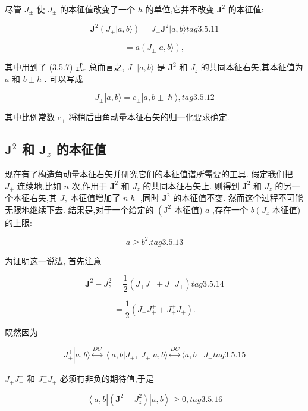 尽管 ${J}_{ \pm }$ 使 ${J}_{ \pm }$ 的本征值改变了一个 $h$ 的单位,它并不改变 ${\mathbf{J}}^{2}$ 的本征值:

$$
{\mathbf{J}}^{2}\left( {{J}_{ \pm }|a, b\rangle }\right) = {J}_{ \pm }{\mathbf{J}}^{2}|a, b\rangle tag{3. 5.11}
$$

$$
= a\left( {{J}_{ \pm }|a, b\rangle }\right) ,
$$

其中用到了 (3.5.7) 式. 总而言之, ${J}_{ \pm }|a, b\rangle$ 是 ${\mathbf{J}}^{2}$ 和 ${J}_{z}$ 的共同本征右矢,其本征值为 $a$ 和 $b \pm h$ . 可以写成

$$
{J}_{ \pm }\left| {a, b\rangle = {c}_{ \pm }}\right| a, b \pm \hslash \rangle , tag{3. 5.12}
$$

其中比例常数 ${c}_{ \pm }$ 将稍后由角动量本征右矢的归一化要求确定.

\subsection{${\mathbf{J}}^{2}$ 和 ${\mathbf{J}}_{z}$ 的本征值}

现在有了构造角动量本征右矢并研究它们的本征值谱所需要的工具. 假定我们把 ${J}_{ + }$ 连续地,比如 $n$ 次,作用于 ${\mathbf{J}}^{2}$ 和 ${J}_{z}$ 的共同本征右矢上. 则得到 ${\mathbf{J}}^{2}$ 和 ${J}_{z}$ 的另一个本征右矢,其 ${J}_{z}$ 本征值增加了 $n\hslash$ ,同时 ${\mathbf{J}}^{2}$ 的本征值不变. 然而这个过程不可能无限地继续下去. 结果是,对于一个给定的 $\left( {\mathrm{J}}^{2}\right.$ 本征值) $a$ ,存在一个 $b\left( {J}_{z}\right.$ 本征值) 的上限:

$$
a \geq {b}^{2}\text{.} tag{3.5.13}
$$

为证明这一说法, 首先注意

$$
{\mathbf{J}}^{2} - {J}_{z}^{2} = \frac{1}{2}\left( {{J}_{ + }{J}_{ - } + {J}_{ - }{J}_{ + }}\right) tag{3. 5.14}
$$

$$
= \frac{1}{2}\left( {{J}_{ + }{J}_{ + }^{ + } + {J}_{ + }^{ + }{J}_{ + }}\right) .
$$

既然因为

$$
{J}_{ + }^{ + }\left| {a, b\rangle \overset{DC}{ \leftrightarrow }\left\langle {a, b}\right| {J}_{ + },\;{J}_{ + }}\right| a, b\rangle \overset{DC}{ \leftrightarrow }\langle a, b \mid {J}_{ + }^{ + } tag{3. 5.15}
$$

${J}_{ + }{J}_{ + }^{ + }$ 和 ${J}_{ + }^{ + }{J}_{ + }$ 必须有非负的期待值,于是

$$
\left\langle {a, b\left| \left( {{\mathbf{J}}^{2} - {J}_{z}^{2}}\right) \right| a, b}\right\rangle \geq 0, tag{3. 5.16}
$$

